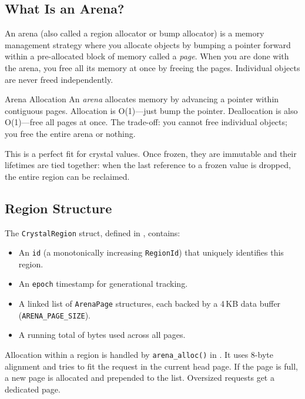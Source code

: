 \subsection{What Is an Arena?}

An arena (also called a region allocator or bump allocator) is a memory management strategy where you allocate objects by bumping a pointer forward within a pre-allocated block of memory called a \emph{page}.
When you are done with the arena, you free all its memory at once by freeing the pages.
Individual objects are never freed independently.

\begin{defnbox}{Arena Allocation}
An \emph{arena} allocates memory by advancing a pointer within contiguous pages.
Allocation is O(1)---just bump the pointer.
Deallocation is also O(1)---free all pages at once.
The trade-off: you cannot free individual objects; you free the entire arena or nothing.
\end{defnbox}

This is a perfect fit for crystal values.
Once frozen, they are immutable and their lifetimes are tied together: when the last reference to a frozen value is dropped, the entire region can be reclaimed.

\subsection{Region Structure}

The \lstinline|CrystalRegion| struct, defined in , contains:

\begin{itemize}
  \item An \lstinline|id| (a monotonically increasing \lstinline|RegionId|) that uniquely identifies this region.
  \item An \lstinline|epoch| timestamp for generational tracking.
  \item A linked list of \lstinline|ArenaPage| structures, each backed by a 4\,KB data buffer (\lstinline|ARENA_PAGE_SIZE|).
  \item A running total of bytes used across all pages.
\end{itemize}

Allocation within a region is handled by \lstinline|arena_alloc()| in .
It uses 8-byte alignment and tries to fit the request in the current head page.
If the page is full, a new page is allocated and prepended to the list.
Oversized requests get a dedicated page.

